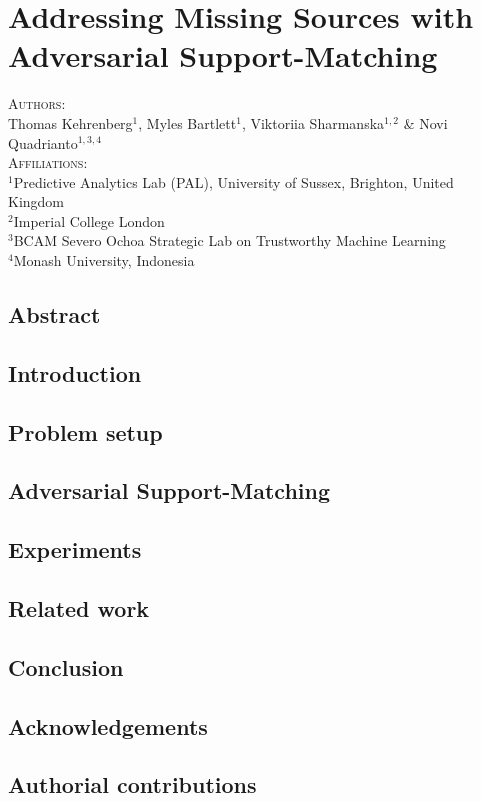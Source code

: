 \chapter{Addressing Missing Sources with Adversarial Support-Matching}\label{ch:supmatch}
\textsc{Authors}:\\
%
Thomas Kehrenberg$^1$, 
Myles Bartlett$^1$,
Viktoriia Sharmanska$^{1, 2}$ \& 
Novi Quadrianto$^{1,3,4}$ \\
%
\textsc{Affiliations}:\\
$^1$Predictive Analytics Lab (PAL), University of Sussex, Brighton, United Kingdom \\
$^2$Imperial College London \\ 
$^3$BCAM Severo Ochoa Strategic Lab on Trustworthy Machine Learning \\
$^4$Monash University, Indonesia \\
%

\section*{Abstract}

\label{sec:sm-abstract}

\section{Introduction}
\label{sec:sm-intro}


\section{Problem setup}
\label{sec:sm-problem-setup}


\section{Adversarial Support-Matching}
\label{sec:sm-adversarialsm}


\section{Experiments}
\label{sec:sm-exps}


\section{Related work}
\label{sec:sm-related-work}


\section{Conclusion}
\label{sec:sm-conclusion}


\section*{Acknowledgements}
\label{sec:sm-ack}


\newpage


\clearpage
\section{Authorial contributions}

